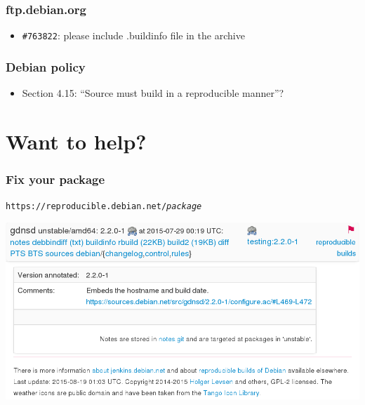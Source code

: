 \documentclass[14pt]{beamer}
\begin{document}
\begin{frame}
 \frametitle{ftp.debian.org}

 \begin{itemize}\small
  \item \texttt{\#763822}: please include .buildinfo file in the archive
 \end{itemize}
\end{frame}


\begin{frame}
 \frametitle{Debian policy}

 \begin{itemize}
  \item Section 4.15: “Source must build in a reproducible manner”? 
 \end{itemize}
\end{frame}

\section{Want to help?}

\begin{frame}
 \frametitle{Fix your package}

 \begin{center}
  \texttt{https://reproducible.debian.net/\textit{package}}

  \includegraphics[width=\linewidth]{images/rdn-gdnsd.png}
 \end{center}
\end{frame}
\end{document}
